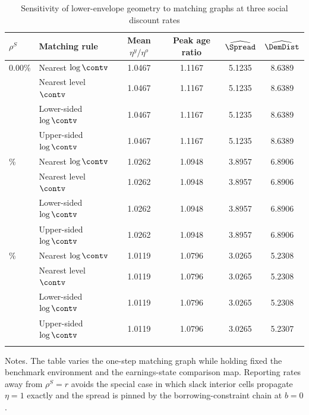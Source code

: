 \begin{table}[!htbp]
\centering
\caption{Sensitivity of lower-envelope geometry to matching graphs at three social discount rates}
\label{tab:baseline-sensitivity}
\footnotesize
\renewcommand{\arraystretch}{1.06}
\begin{tabular}{llcccc}
\toprule
$\rho^{S}$ & Matching rule & Mean $\eta^{y}/\eta^{o}$ & Peak age ratio & $\widehat{\Spread}$ & $\widehat{\DemDist}$ \\
\midrule
0.00\% & Nearest $\log \contv$ & 1.0467 & 1.1167 & 5.1235 & 8.6389 \\
 & Nearest level $\contv$ & 1.0467 & 1.1167 & 5.1235 & 8.6389 \\
 & Lower-sided $\log \contv$ & 1.0467 & 1.1167 & 5.1235 & 8.6389 \\
 & Upper-sided $\log \contv$ & 1.0467 & 1.1167 & 5.1235 & 8.6389 \\
\addlinespace[0.15em]
2.00\% & Nearest $\log \contv$ & 1.0262 & 1.0948 & 3.8957 & 6.8906 \\
 & Nearest level $\contv$ & 1.0262 & 1.0948 & 3.8957 & 6.8906 \\
 & Lower-sided $\log \contv$ & 1.0262 & 1.0948 & 3.8957 & 6.8906 \\
 & Upper-sided $\log \contv$ & 1.0262 & 1.0948 & 3.8957 & 6.8906 \\
\addlinespace[0.15em]
3.44\% & Nearest $\log \contv$ & 1.0119 & 1.0796 & 3.0265 & 5.2308 \\
 & Nearest level $\contv$ & 1.0119 & 1.0796 & 3.0265 & 5.2308 \\
 & Lower-sided $\log \contv$ & 1.0119 & 1.0796 & 3.0265 & 5.2308 \\
 & Upper-sided $\log \contv$ & 1.0119 & 1.0796 & 3.0265 & 5.2307 \\
\addlinespace[0.15em]
\bottomrule
\end{tabular}
\begin{minipage}{0.96\textwidth}
\footnotesize Notes. The table varies the one-step matching graph while holding fixed the benchmark environment and the earnings-state comparison map. Reporting rates away from $\rho^{S}=r$ avoids the special case in which slack interior cells propagate $\eta=1$ exactly and the spread is pinned by the borrowing-constraint chain at $b=0$.
\end{minipage}
\end{table}
